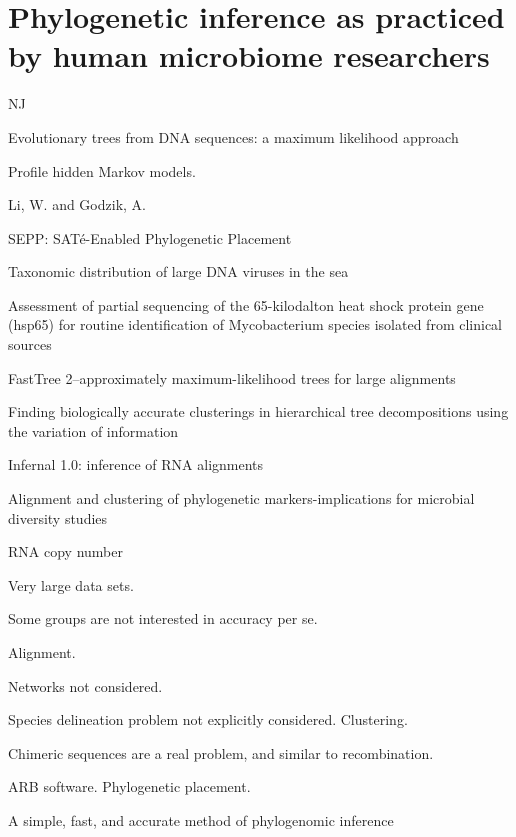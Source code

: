 \documentclass{amsart}
\begin{document}
\section{Phylogenetic inference as practiced by human microbiome researchers}

NJ

\cite{felsenstein1981evolutionary}
{Evolutionary trees from DNA sequences: a maximum likelihood approach}

\cite{eddy1998profile}
Profile hidden Markov models.

\cite{li2006cdhit}
Li, W.  and Godzik, A.
\cite{edgar2010usearch}

\cite{mirarabsepp}
{SEPP: SAT{\'e}-Enabled Phylogenetic Placement}

\cite{monierEaLargeViruses08}
{Taxonomic distribution of large DNA viruses in the sea}


\cite{huson2007megan}

\cite{mcnabb2004hsp65}
{{A}ssessment of partial sequencing of the 65-kilodalton heat shock protein gene (hsp65) for routine identification of {M}ycobacterium species isolated from clinical sources}

\cite{price2010fasttree}
{FastTree 2--approximately maximum-likelihood trees for large alignments}

\cite{navlakha2009finding}
Finding biologically accurate clusterings in hierarchical tree decompositions using the variation of information

\cite{nawrocki2009infernal}
Infernal 1.0: inference of RNA alignments


\cite{white2010alignment}
Alignment and clustering of phylogenetic markers-implications for microbial diversity studies


RNA copy number
\cite{morganEaInVitroSimulatedMetagenome10}


Very large data sets.

Some groups are not interested in accuracy per se.

Alignment.

Networks not considered.

Species delineation problem not explicitly considered. Clustering.

Chimeric sequences are a real problem, and similar to recombination.

ARB software.
Phylogenetic placement.

\cite{wu2008simple}
A simple, fast, and accurate method of phylogenomic inference
\end{document}
